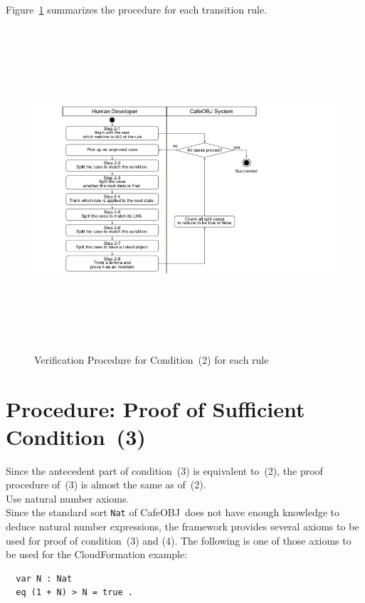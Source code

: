 \documentclass[12pt]{report}
\newcommand{\cafeobj}{{\sf CafeOBJ}~}
\begin{document}
Figure~\ref{fig:procedure2} summarizes the procedure for each transition rule.
\begin{figure}
\centering
\includegraphics[height=12cm,natwidth=720,natheight=405,clip,trim=60 0 180 0]{procedure2.png}
\caption{Verification Procedure for Condition~(2) for each rule}
\label{fig:procedure2}
\end{figure}

\section{Procedure: Proof of Sufficient Condition~(3)}
\label{sec:mesmes}
Since the antecedent part of condition~(3) is equivalent
to~(2), the proof procedure of~(3) is
almost the same as of~(2). \\

 Use natural number axioms. \\
Since the standard sort {\tt Nat} of \cafeobj does not have enough
knowledge to deduce natural number expressions, the framework provides
several axioms to be used for proof of condition~(3) and
(4).  The following is one of those axioms to be used
for the CloudFormation example:
\small
\begin{verbatim}
  var N : Nat
  eq (1 + N) > N = true .
\end{verbatim}
\normalsize
\end{document}
